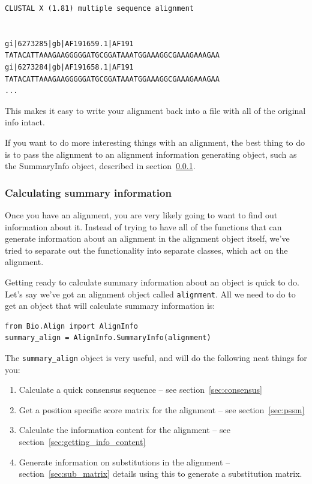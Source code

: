 \documentclass{article}
\begin{document}
\begin{verbatim}
CLUSTAL X (1.81) multiple sequence alignment


gi|6273285|gb|AF191659.1|AF191      TATACATTAAAGAAGGGGGATGCGGATAAATGGAAAGGCGAAAGAAAGAA
gi|6273284|gb|AF191658.1|AF191      TATACATTAAAGAAGGGGGATGCGGATAAATGGAAAGGCGAAAGAAAGAA
...
\end{verbatim}

This makes it easy to write your alignment back into a file with all of the original info intact.


If you want to do more interesting things with an alignment, the best thing to do is to pass the alignment to an alignment information generating object, such as the SummaryInfo object, described in section~\ref{sec:summary_info}.

\subsubsection{Calculating summary information}
\label{sec:summary_info}

Once you have an alignment, you are very likely going to want to find out information about it. Instead of trying to have all of the functions that can generate information about an alignment in the alignment object itself, we've tried to separate out the functionality into separate classes, which act on the alignment. 


Getting ready to calculate summary information about an object is quick to do. Let's say we've got an alignment object called \verb|alignment|. All we need to do to get an object that will calculate summary information is:

\begin{verbatim}
from Bio.Align import AlignInfo
summary_align = AlignInfo.SummaryInfo(alignment)
\end{verbatim}

The \verb|summary_align| object is very useful, and will do the following neat things for you:

\begin{enumerate}
  \item Calculate a quick consensus sequence -- see section~\ref{sec:consensus}
  \item Get a position specific score matrix for the alignment -- see section~\ref{sec:pssm}
  \item Calculate the information content for the alignment -- see section~\ref{sec:getting_info_content}
  \item Generate information on substitutions in the alignment -- section~\ref{sec:sub_matrix} details using this to generate a substitution matrix.
\end{enumerate}
\end{document}

